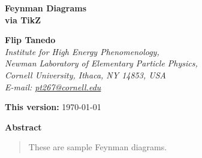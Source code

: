 \documentclass[12pt]{article}	%
\numberwithin{equation}{section} \setlength{\textwidth}{17.5cm}
\begin{document}
\begin{titlepage}
\begin{flushright}
\end{flushright}

\begin{center}
{\huge\bf Feynman Diagrams}\\
{\Large \bf via TikZ}

\medskip
\bigskip\color{black}\vspace{0.6cm}
{
{\large\bf 
Flip Tanedo}
}
\\[7mm]
{\it Institute for High Energy Phenomenology,\\ Newman Laboratory of Elementary Particle Physics,\\
Cornell University, Ithaca, NY 14853, USA}
\\
\vspace*{0.3cm}
{\it E-mail: \rm{
 \href{mailto:pt267@cornell.edu}{pt267@cornell.edu}}}
\bigskip

{\large \textbf{This version:} \today}

\bigskip\bigskip

{
\centerline{\large\bf Abstract}
\begin{quote}

These are sample Feynman diagrams.

\end{quote}}



\end{center}
\bigskip\bigskip
\setcounter{tocdepth}{2}
\tableofcontents
\end{titlepage}
\end{document}
